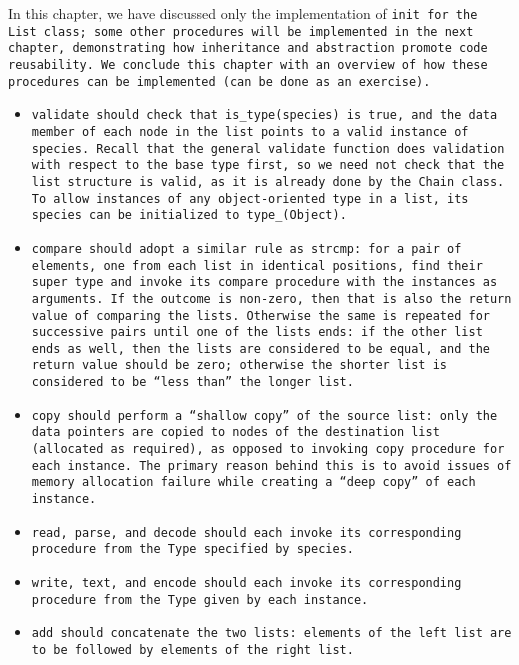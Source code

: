 In this chapter, we have discussed only the implementation of \tt{init} for the
\tt{List} class; some other procedures will be implemented in the next chapter,
demonstrating how inheritance and abstraction promote code reusability.
We conclude this chapter with an overview of how these
procedures can be implemented (can be done as an exercise).

\begin{itemize}

\item \tt{validate} should check that \tt{is_type(species)}
is \tt{true}, and the \tt{data} member of each node in
the list points to a valid instance of \tt{species}.
Recall that the general \tt{validate} function does validation with
respect to the base type first, so we need not check that the list
structure is valid, as it is already done by the \tt{Chain} class.
To allow instances of any object-oriented type in a list,
its \tt{species} can be initialized to \tt{type_(Object)}.

\item \tt{compare} should adopt a similar rule as \tt{strcmp}: for a pair
of elements, one from each list in identical positions, find their super
type and invoke its \tt{compare} procedure with the instances as arguments.
If the outcome is non-zero, then that is
also the return value of comparing the lists.
Otherwise the same is repeated for successive pairs until one of
the lists ends: if the other list ends as well, then the lists
are considered to be equal, and the return value should be zero;
otherwise the shorter list is considered to be ``less than'' the longer list.

\item \tt{copy} should perform a ``shallow copy'' of the source list: only
the data pointers are copied to nodes of the destination list (allocated as
required), as opposed to invoking \tt{copy} procedure for each instance.
The primary reason behind this is to avoid issues of memory
allocation failure while creating a ``deep copy'' of each instance.

\item \tt{read}, \tt{parse}, and \tt{decode} should each invoke its
corresponding procedure from the \tt{Type} specified by \tt{species}.

\item \tt{write}, \tt{text}, and \tt{encode} should each invoke its
corresponding procedure from the \tt{Type} given by each instance.

\item \tt{add} should concatenate the two lists: elements of
the left list are to be followed by elements of the right list.

\end{itemize}
